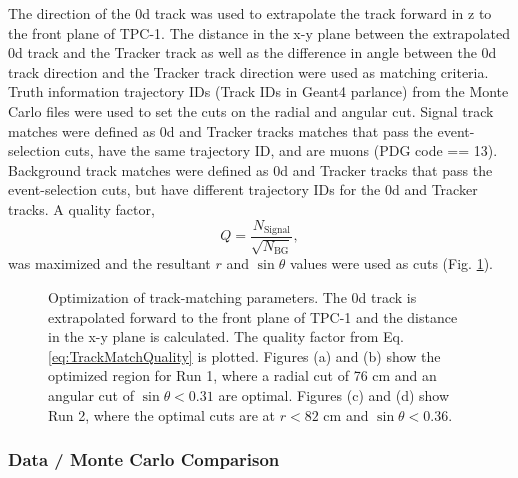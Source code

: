 The direction of the \p0d track was used to extrapolate the track forward in z
to the front plane of TPC-1. The distance in the x-y plane between the
extrapolated \p0d track and the Tracker track as well as the difference in angle
between the \p0d track direction and the Tracker track direction were used as
matching criteria.  Truth information trajectory IDs (Track IDs in Geant4
parlance) from the Monte Carlo files were used to set the cuts on the radial and
angular cut. Signal track matches were defined as \p0d and Tracker tracks
matches that pass the event-selection cuts, have the same trajectory ID, and are
muons (PDG code == 13). Background track matches were defined as \p0d and
Tracker tracks that pass the event-selection cuts, but have different trajectory
IDs for the \p0d and Tracker tracks. A quality factor, 
\begin{equation}
Q = \frac{N_{\text{Signal}}}{\sqrt{N_\text{BG}}},
\label{eq:TrackMatchQuality}
\end{equation}
was maximized and the resultant $r$ and $\sin \theta$ values were used as cuts
(Fig. \ref{fig:CrossCheckTrackMatchingQuality}).

\begin{figure}
\centering
{}

\caption{Optimization of track-matching parameters. The \p0d track is
extrapolated forward to the front plane of TPC-1 and the distance in the x-y
plane is calculated. The quality factor from Eq. \ref{eq:TrackMatchQuality} is
plotted. Figures (a) and (b) show the optimized region for Run 1,
where a radial cut of 76 cm and an angular cut of $\sin\theta < 0.31$ are
optimal. Figures (c) and (d) show Run 2, where the optimal cuts are at $r < 82$
cm and $\sin\theta < 0.36$.
}
\label{fig:CrossCheckTrackMatchingQuality}
\end{figure}



\subsubsection{Data / Monte Carlo Comparison}


